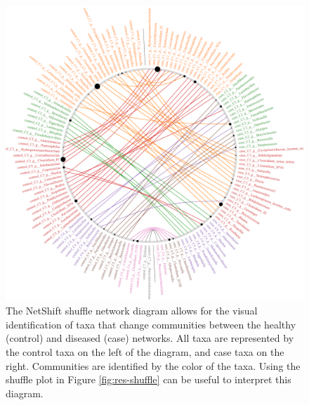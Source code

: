 \begin{figure}[htb!]
    \centering
    \includegraphics[width=1.0\linewidth]{figure/results/shuffle_net.png}
    \caption[The NetShift shuffle network diagram allows for the visual identification of taxa that change communities between the healthy (control) and diseased (case) networks.]{The NetShift shuffle network diagram allows for the visual identification of taxa that change communities between the healthy (control) and diseased (case) networks. All taxa are represented by the control taxa on the left of the diagram, and case taxa on the right. Communities are identified by the color of the taxa. Using the shuffle plot in Figure \ref{fig:res-shuffle} can be useful to interpret this diagram.}
    \label{apdx-nesh-shuffle}
\end{figure}
